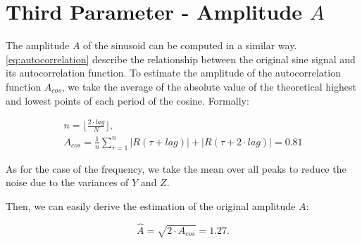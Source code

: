 \section{Third Parameter - Amplitude $A$}
\label{sec:amplitude}

The amplitude $A$ of the sinusoid can be computed in a similar way.
\cref{eq:autocorrelation} describe the relationship between the original sine signal and its autocorrelation function.
To estimate the amplitude of the autocorrelation function $A_{cos}$, we take the average of the absolute value of the theoretical highest and lowest points of each period of the cosine.
Formally:

\begin{equation}
    \begin{gathered}
        n = \Big\lfloor \frac{2 \cdot lag}{N} \Big\rfloor, \\
        A_{cos} = \frac{1}{n} \sum_{\tau=1}^{n} |R(\tau + lag)| + |R(\tau + 2 \cdot lag)| = 0.81
    \end{gathered}
\end{equation}

As for the case of the frequency, we take the mean over all peaks to reduce the noise due to the variances of $Y$ and $Z$.

Then, we can easily derive the estimation of the original amplitude $A$:

\begin{equation*}
    \hat{A} = \sqrt{2 \cdot A_{cos}} = 1.27.
\end{equation*}